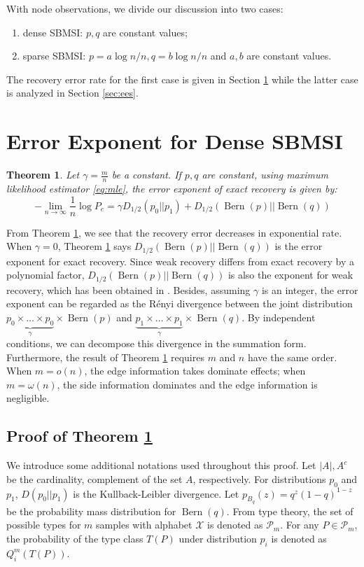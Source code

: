 \documentclass[conference,letterpaper]{IEEEtran}
\newtheorem{theorem}{Theorem}
\DeclareMathOperator{\Bern}{Bern}
\begin{document}
With node observations, we divide our discussion into two cases:
\begin{enumerate}
	\item dense SBMSI: $p,q$ are constant values;
\item sparse SBMSI: $p = a \log n /n, q = b \log n / n$ and $a,b$ are constant values.
\end{enumerate}
The recovery error rate for the first case is given in Section \ref{sec:ee} while
the latter case is analyzed in Section \ref{sec:ees}.
\section{Error Exponent for Dense SBMSI}\label{sec:ee}
\begin{theorem}\label{thm:constant}
	Let $\gamma = \frac{m}{n}$ be a constant. If $p,q$ are constant, using maximum likelihood estimator \eqref{eq:mle},
	the error exponent of exact recovery is given by:
	\begin{equation}
	-\lim_{n\to \infty} \frac{1}{n}\log P_e =  \gamma D_{1/2}(p_0 || p_1) + D_{1/2}(\Bern(p)||\Bern(q))
	\end{equation} 
\end{theorem}
From Theorem \ref{thm:constant}, we see that the recovery error decreases in exponential rate.
When $\gamma=0$, Theorem \ref{thm:constant} says $D_{1/2}(\Bern(p)||\Bern(q))$
is the error exponent for exact recovery. Since weak recovery differs from exact recovery by a polynomial factor, $D_{1/2}(\Bern(p)||\Bern(q))$ is also the exponent for weak recovery, which has been obtained
in \cite{zhang2016}.
Besides, assuming $\gamma$ is an integer,
the error exponent can be regarded as the Rényi divergence
between the joint distribution
$\underbrace{p_0\times \dots \times p_0}_{\gamma} \times \Bern(p)$
and $\underbrace{p_1\times \dots \times p_1}_{\gamma} \times \Bern(q)$.
By independent conditions,
we can decompose this
divergence in the summation form.
Furthermore, the result of Theorem \ref{thm:constant}
requires $m$ and $n$ have the same order.
When $m=o(n)$,
the edge information takes dominate effects;
when $m=\omega(n)$,
the side information dominates and the edge information is negligible.

\subsection{Proof of Theorem \ref{thm:constant}}
We introduce some additional notations used throughout this proof. Let 
$|A|, A^c$ be the cardinality, complement of the set $A$, respectively. For distributions $p_0$ and $p_1$,
$D(p_0 || p_1)$ is the Kullback-Leibler divergence.
 Let
$p_{B_q}(z) = q^z(1-q)^{1-z}$ be the probability mass distribution for $\Bern(q)$.
From type theory, the set of possible types
for $m$ samples with alphabet $\mathcal{X}$ is denoted as $\mathcal{P}_m$. For any $P\in \mathcal{P}_m$, the probability of the type
class $T(P)$ under distribution $p_i$ is denoted as $Q_i^{m}(T(P))$.
\end{document}
